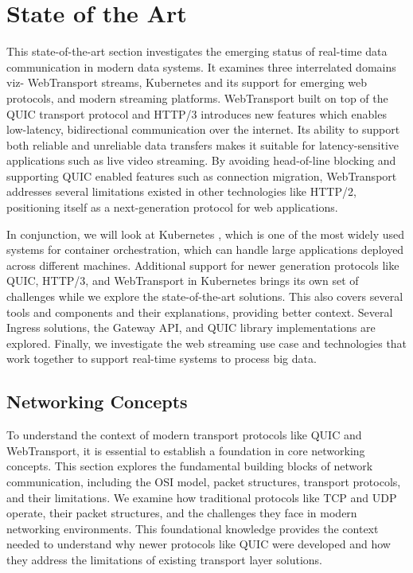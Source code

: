\chapter{State of the Art}

This state-of-the-art section investigates the emerging status of real-time data communication in modern data systems. It examines three interrelated domains viz- WebTransport streams, Kubernetes and its support for emerging web protocols, and modern streaming platforms. WebTransport \cite{webtransport-draft} built on top of the QUIC transport protocol \cite{rfc9000} and HTTP/3 \cite{rfc9114} introduces new features which enables low-latency, bidirectional communication over the internet. Its ability to support both reliable and unreliable data transfers makes it suitable for latency-sensitive applications such as live video streaming. By avoiding head-of-line blocking and supporting QUIC enabled features such as connection migration, WebTransport addresses several limitations existed in other technologies like HTTP/2, positioning itself as a next-generation protocol for web applications.


In conjunction, we will look at Kubernetes \cite{kubernetes-docs}, which is one of the most widely used systems for container orchestration, which can handle large applications deployed across different machines. Additional support for newer generation protocols like QUIC, HTTP/3, and WebTransport in Kubernetes brings its own set of challenges while we explore the state-of-the-art solutions. This also covers several tools and components and their explanations, providing better context. Several Ingress solutions, the Gateway API, and QUIC library implementations are explored. Finally, we investigate the web streaming use case and technologies that work together to support real-time systems to process big data.




\section{Networking Concepts}

To understand the context of modern transport protocols like QUIC and WebTransport, it is essential to establish a foundation in core networking concepts. This section explores the fundamental building blocks of network communication, including the OSI model, packet structures, transport protocols, and their limitations. We examine how traditional protocols like TCP and UDP operate, their packet structures, and the challenges they face in modern networking environments. This foundational knowledge provides the context needed to understand why newer protocols like QUIC were developed and how they address the limitations of existing transport layer solutions.

